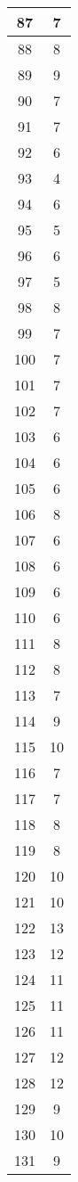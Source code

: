 \documentclass[letterpaper, 12pt]{article}
\begin{document}
\begin{longtable}{|c|c|}
\hline
87 & 7 \\
\hline
88 & 8 \\
\hline
89 & 9 \\
\hline
90 & 7 \\
\hline
91 & 7 \\
\hline
92 & 6 \\
\hline
93 & 4 \\
\hline
94 & 6 \\
\hline
95 & 5 \\
\hline
96 & 6 \\
\hline
97 & 5 \\
\hline
98 & 8 \\
\hline
99 & 7 \\
\hline
100 & 7 \\
\hline
101 & 7 \\
\hline
102 & 7 \\
\hline
103 & 6 \\
\hline
104 & 6 \\
\hline
105 & 6 \\
\hline
106 & 8 \\
\hline
107 & 6 \\
\hline
108 & 6 \\
\hline
109 & 6 \\
\hline
110 & 6 \\
\hline
111 & 8 \\
\hline
112 & 8 \\
\hline
113 & 7 \\
\hline
114 & 9 \\
\hline
115 & 10 \\
\hline
116 & 7 \\
\hline
117 & 7 \\
\hline
118 & 8 \\
\hline
119 & 8 \\
\hline
120 & 10 \\
\hline
121 & 10 \\
\hline
122 & 13 \\
\hline
123 & 12 \\
\hline
124 & 11 \\
\hline
125 & 11 \\
\hline
126 & 11 \\
\hline
127 & 12 \\
\hline
128 & 12 \\
\hline
129 & 9 \\
\hline
130 & 10 \\
\hline
131 & 9 \\

\end{longtable}
\end{document}
